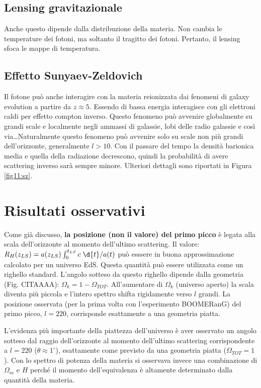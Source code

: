 \subsection{Lensing gravitazionale}
Anche questo dipende dalla distribuzione della materia. Non cambia le temperature dei fotoni, ma soltanto il tragitto dei fotoni. Pertanto, il lensing sfoca le mappe di temperatura. 

\subsection{Effetto Sunyaev-Zeldovich}
Il fotone può anche interagire con la materia reionizzata dai fenomeni di galaxy evolution a partire da $z\approx 5$. Essendo di bassa energia interagisce con gli elettroni caldi per effetto compton inverso. Questo fenomeno può avvenire globalmente su grandi scale e localmente negli ammassi di galassie, lobi delle radio galassie e così via\dots Naturalmente questo fenomeno può avvenire solo su scale non più grandi dell'orizzonte, generalmente $l>10$. Con il passare del tempo la densità barionica media e quella della radiazione decrescono, quindi la probabilità di avere scattering inverso sarà sempre minore. Ulteriori dettagli sono riportati in Figura \ref{fig11:sz}.



\section{Risultati osservativi}
Come già discusso, \textbf{la posizione (non il valore) del primo picco} è legata alla scala dell'orizzonte al momento dell'ultimo scattering. Il valore: $R_H(z_{LS})=a(z_{LS})\int_0^{t_{LS}}c \; \d{t} / a(t)$ può esssere in buona approssimazione calcolato per un universo EdS. Questa quantità può essere utilizzata come un righello standard. L'angolo sotteso da questo righello dipende dalla geometria (Fig. CITAAAA): $\Omega_k = 1-\Omega_{TOT}$. All'aumentare di $\Omega_k$ (universo aperto) la scala diventa più piccola e l'intero spettro shifta rigidamente verso $l$ grandi. La posizione osservata (per la prima volta con l'esperimento BOOMERanG) del primo picco, $l=220$, corrisponde esattamente a una geometria piatta.

\begin{definition}
    L'evidenza più importante della piattezza dell'universo è aver osservato un angolo sotteso dal raggio dell'orizzonte al momento dell'ultimo scattering corrispondente a $l=220$ ($\theta \approx 1^\circ$), esattamente come previsto da una geometria piatta ($\Omega_{TOT}=1$). Con lo spettro di potenza della materia si osservava invece una combinazione di $\Omega_m$ e $H$ perché il momento dell'equivalenza è altamente determinato dalla quantità della materia.
\end{definition}

